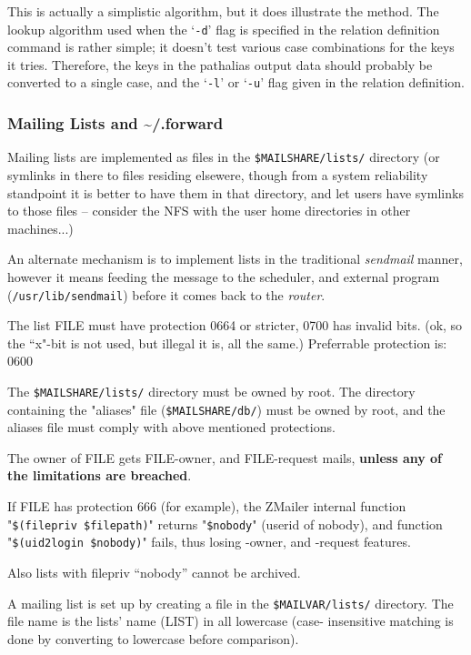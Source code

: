 This is actually a simplistic algorithm, but it does illustrate the method.
The lookup algorithm used when the `{\tt -d}' flag is specified in the
relation definition command is rather simple; it doesn't test various case
combinations for the keys it tries.  Therefore, the keys in the pathalias
output data should probably be converted to a single case, and the `{\tt -l}'
or `{\tt -u}' flag given in the relation definition.






\subsubsection{Mailing Lists and \~{}/.forward \label{mailing_list_maintenance}}



Mailing lists are implemented as files in the {\tt \$MAILSHARE/lists/} 
directory (or symlinks in there to files residing elsewere, though from a system
reliability standpoint it is better to have them in that directory,
and let users have symlinks to those files -- consider the NFS
with the user home directories in other machines...)

An alternate mechanism is to implement lists in the traditional {\em sendmail\/}
manner, however it means feeding the message to the scheduler, and
external program ({\tt /usr/lib/sendmail}) before it comes back to the
{\em router\/}.

The list FILE must have protection 0664 or stricter, 0700 has invalid bits.
(ok, so the ``x"-bit is not used, but illegal it is, all the same.)
Preferrable protection is: 0600

The {\tt \$MAILSHARE/lists/} directory must be owned by root.
The directory containing the "aliases" file  ({\tt \$MAILSHARE/db/}) 
must be owned by root, and the aliases file must comply with above mentioned 
protections.

The owner of FILE gets FILE-owner, and FILE-request mails, {\bf unless any
of the limitations are breached}.

If FILE has protection 666 (for example), the ZMailer internal function
"{\tt \$(filepriv \$filepath)}" 
returns "{\tt \$nobody}" (userid of nobody), and  function
"{\tt \$(uid2login \$nobody)}" fails, thus losing -owner, and 
-request features.

Also lists with filepriv ``nobody'' cannot be archived.

A mailing list is set up by creating a file in the 
{\tt \$MAILVAR/lists/} directory.
The file name is the lists' name (LIST) in all lowercase (case-
insensitive matching is done by converting to lowercase before
comparison).

